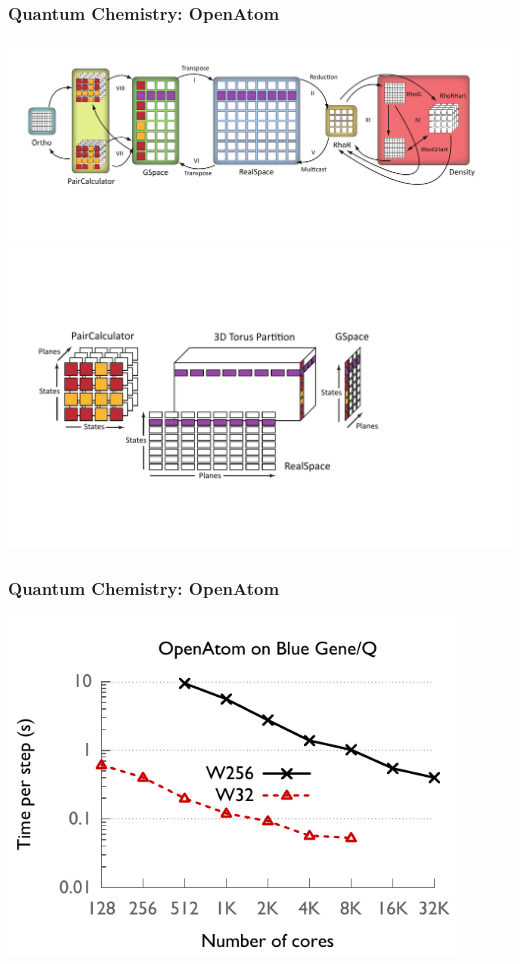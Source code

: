 \begin{frame}
\frametitle{Quantum Chemistry: OpenAtom}
\includegraphics[width=0.45\textheight]{../figures/openatom/control-flow.pdf}
\includegraphics[width=0.45\textheight]{../figures/openatom/mapping.pdf}
\end{frame}


\begin{frame}
\frametitle{Quantum Chemistry: OpenAtom}
\includegraphics[width=0.9\textwidth]{../figures/openatom/bgq.pdf}
\end{frame}


